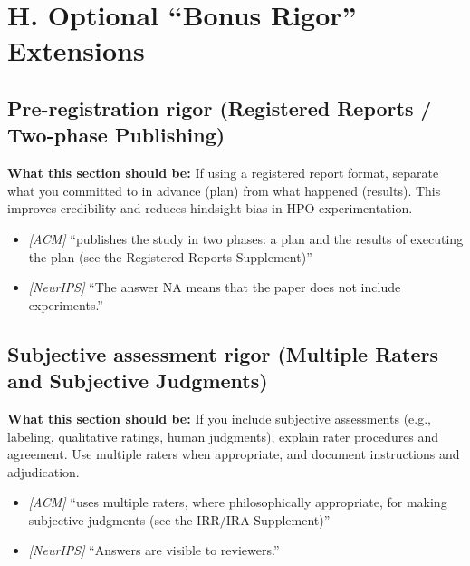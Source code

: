\documentclass[11pt]{article}
\begin{document}
\section*{H. Optional ``Bonus Rigor'' Extensions}

\subsection{Pre-registration rigor (Registered Reports / Two-phase Publishing)}
\noindent\textbf{What this section should be:}
If using a registered report format, separate what you committed to in advance (plan) from what happened (results). This improves credibility and reduces hindsight bias in HPO experimentation.
\begin{itemize}
  \item \textit{[ACM]} ``publishes the study in two phases: a plan and the results of executing the plan (see the Registered Reports Supplement)''
  \item \textit{[NeurIPS]} ``The answer NA means that the paper does not include experiments.''
\end{itemize}

\subsection{Subjective assessment rigor (Multiple Raters and Subjective Judgments)}
\noindent\textbf{What this section should be:}
If you include subjective assessments (e.g., labeling, qualitative ratings, human judgments), explain rater procedures and agreement. Use multiple raters when appropriate, and document instructions and adjudication.
\begin{itemize}
  \item \textit{[ACM]} ``uses multiple raters, where philosophically appropriate, for making subjective judgments (see the IRR/IRA Supplement)''
  \item \textit{[NeurIPS]} ``Answers are visible to reviewers.''
\end{itemize}
\end{document}
